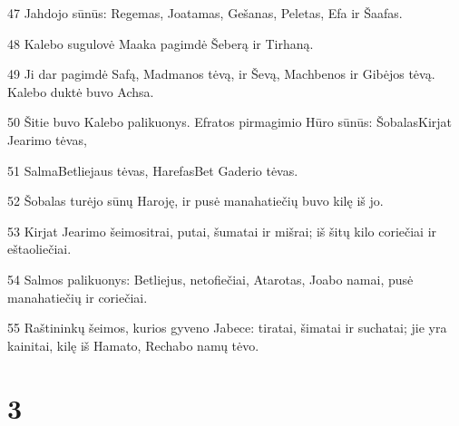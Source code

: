 \par 47 Jahdojo sūnūs: Regemas, Joatamas, Gešanas, Peletas, Efa ir Šaafas. 
\par 48 Kalebo sugulovė Maaka pagimdė Šeberą ir Tirhaną. 
\par 49 Ji dar pagimdė Safą, Madmanos tėvą, ir Ševą, Machbenos ir Gibėjos tėvą. Kalebo duktė buvo Achsa. 
\par 50 Šitie buvo Kalebo palikuonys. Efratos pirmagimio Hūro sūnūs: Šobalas­Kirjat Jearimo tėvas, 
\par 51 Salma­Betliejaus tėvas, Harefas­Bet Gaderio tėvas. 
\par 52 Šobalas turėjo sūnų Haroję, ir pusė manahatiečių buvo kilę iš jo. 
\par 53 Kirjat Jearimo šeimos­itrai, putai, šumatai ir mišrai; iš šitų kilo coriečiai ir eštaoliečiai. 
\par 54 Salmos palikuonys: Betliejus, netofiečiai, Atarotas, Joabo namai, pusė manahatiečių ir coriečiai. 
\par 55 Raštininkų šeimos, kurios gyveno Jabece: tiratai, šimatai ir suchatai; jie yra kainitai, kilę iš Hamato, Rechabo namų tėvo.



\chapter{3}


